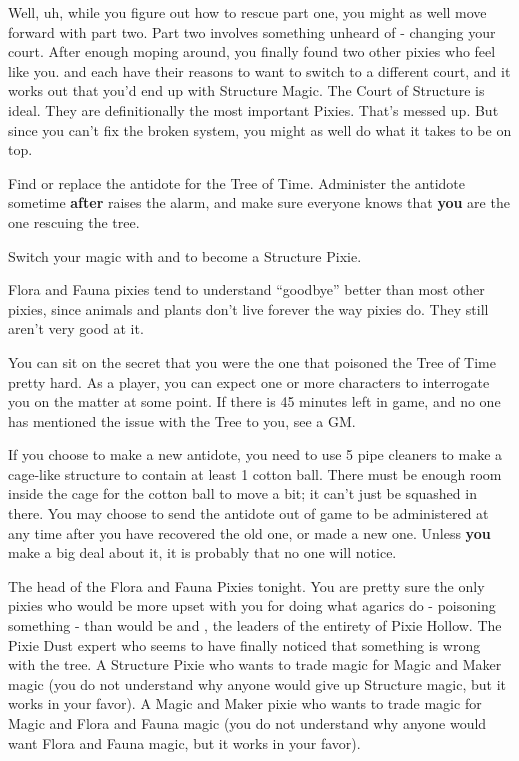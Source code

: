 \documentclass[char]{PP}
\begin{document}
Well, uh, while you figure out how to rescue part one, you might as well move forward with part two. Part two involves something unheard of - changing your court. After enough moping around, you finally found two other pixies who feel like you. \cSAdvisor{} and \cMChange{} each have their reasons to want to switch to a different court, and it works out that you’d end up with Structure Magic. The Court of Structure is ideal. They are definitionally the most important Pixies. That’s messed up. But since you can’t fix the broken system, you might as well do what it takes to be on top.

\begin{itemz}
	\item Find or replace the antidote for the Tree of Time. Administer the antidote sometime \textbf{after} \cMTree{} raises the alarm, and make sure everyone knows that \textbf{you} are the one rescuing the tree.
	\item Switch your magic with \cSAdvisor{} and \cMChange{} to become a Structure Pixie.
\end{itemz}

\begin{itemz}[Notes]
	\item Flora and Fauna pixies tend to understand ``goodbye'' better than most other pixies, since animals and plants don’t live forever the way pixies do. They still aren't very good at it.
	\item You can sit on the secret that you were the one that poisoned the Tree of Time pretty hard. As a player, you can expect one or more characters to interrogate you on the matter at some point. If there is 45 minutes left in game, and no one has mentioned the issue with the Tree to you, see a GM.
	\item If you choose to make a new antidote, you need to use 5 pipe cleaners to make a cage-like structure to contain at least 1 cotton ball. There must be enough room inside the cage for the cotton ball to move a bit; it can't just be squashed in there. You may choose to send the antidote out of game to be administered at any time after you have recovered the old one, or made a new one. Unless \textbf{you} make a big deal about it, it is probably that no one will notice.
\end{itemz}

\begin{contacts}
	\contact{\cFHead{}} The head of the Flora and Fauna Pixies tonight. You are pretty sure the only pixies who would be more upset with you for doing what agarics do - poisoning something - than \cFHead{} would be \cSHead{} and \cSAdvisor{}, the leaders of the entirety of Pixie Hollow.
	\contact{\cMTree{}} The Pixie Dust expert who seems to have finally noticed that something is wrong with the tree.
	\contact{\cSAdvisor{}} A Structure Pixie who wants to trade \cSAdvisor{\their} magic for Magic and Maker magic (you do not understand why anyone would give up Structure magic, but it works in your favor).
	\contact{\cMChange{}} A Magic and Maker pixie who wants to trade \cSAdvisor{\their} magic for Magic and Flora and Fauna magic (you do not understand why anyone would want Flora and Fauna magic, but it works in your favor).
\end{contacts}
\end{document}
